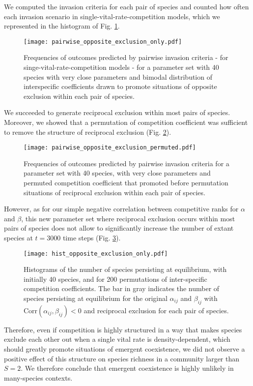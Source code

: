 \documentclass{article}
\begin{document}
We computed the invasion criteria for each pair of species and counted how often each invasion scenario in single-vital-rate-competition models, which we represented in the histogram of Fig. \ref{fig:pairwise_interaction_opposite_exclusion}.
\begin{figure}[H]
    \centering
    \texttt{[image: pairwise\_opposite\_exclusion\_only.pdf]}
    \caption{Frequencies of outcomes predicted by pairwise invasion criteria - for singe-vital-rate-competition models - for a parameter set with 40 species with very close parameters and bimodal distribution of interspecific coefficients drawn to promote situations of opposite exclusion within each pair of species.}
    \label{fig:pairwise_interaction_opposite_exclusion}
\end{figure}
We succeeded to generate reciprocal exclusion within most pairs of species. Moreover, we showed that a permutation of competition coefficient was sufficient to remove the structure of reciprocal exclusion (Fig. \ref{fig:pairwise_interaction_opposite_exclusion_permuted}).
\begin{figure}[H]
    \centering
    \texttt{[image: pairwise\_opposite\_exclusion\_permuted.pdf]}
    \caption{Frequencies of outcomes predicted by pairwise invasion criteria for a parameter set with 40 species, with very close parameters and permuted competition coefficient that promoted before permutation situations of reciprocal exclusion within each pair of species.}
    \label{fig:pairwise_interaction_opposite_exclusion_permuted}
\end{figure}

However, as for our simple negative correlation between competitive ranks for $\alpha$ and $\beta$, this new parameter set where reciprocal exclusion occurs within most pairs of species does not allow to significantly increase the number of extant species at $t=3000$ time steps (Fig. \ref{fig:hist_opposite_exclusion}).
\begin{figure}[H]
    \centering
    \texttt{[image: hist\_opposite\_exclusion\_only.pdf]}
    \caption{Histograms of the number of species persisting at equilibrium, with initially 40 species, and for 200 permutations of inter-specific competition coefficients. The bar in gray indicates the number of species persisting at equilibrium for the original $\alpha_{ij}$ and $\beta_{ij}$ with $\text{Corr}(\alpha_{ij}, \beta_{ij})<0$ and reciprocal exclusion for each pair of species.}
    \label{fig:hist_opposite_exclusion}
\end{figure}
Therefore, even if competition is highly structured in a way that makes species exclude each other out when a single vital rate is density-dependent, which should greatly promote situations of emergent coexistence, we did not observe a positive effect of this structure on species richness in a community larger than $S=2$. We therefore conclude that emergent coexistence is highly unlikely in many-species contexts. 
\end{document}

